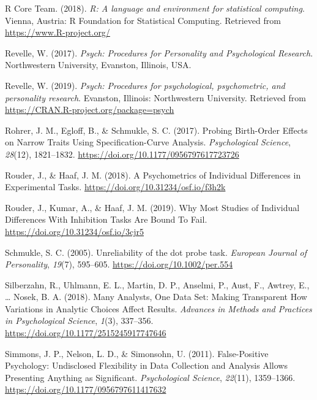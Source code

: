 \documentclass[
  english,
  man,floatsintext]{apa6}
\begin{document}
\leavevmode\hypertarget{ref-R-base}{}%
R Core Team. (2018). \emph{R: A language and environment for statistical computing}. Vienna, Austria: R Foundation for Statistical Computing. Retrieved from \url{https://www.R-project.org/}

\leavevmode\hypertarget{ref-revelle_psych:_2017-1}{}%
Revelle, W. (2017). \emph{Psych: Procedures for Personality and Psychological Research}. Northwestern University, Evanston, Illinois, USA.

\leavevmode\hypertarget{ref-R-psych}{}%
Revelle, W. (2019). \emph{Psych: Procedures for psychological, psychometric, and personality research}. Evanston, Illinois: Northwestern University. Retrieved from \url{https://CRAN.R-project.org/package=psych}

\leavevmode\hypertarget{ref-rohrer_probing_2017}{}%
Rohrer, J. M., Egloff, B., \& Schmukle, S. C. (2017). Probing Birth-Order Effects on Narrow Traits Using Specification-Curve Analysis. \emph{Psychological Science}, \emph{28}(12), 1821--1832. \url{https://doi.org/10.1177/0956797617723726}

\leavevmode\hypertarget{ref-rouder_psychometrics_2018}{}%
Rouder, J., \& Haaf, J. M. (2018). A Psychometrics of Individual Differences in Experimental Tasks. \url{https://doi.org/10.31234/osf.io/f3h2k}

\leavevmode\hypertarget{ref-rouder_why_2019}{}%
Rouder, J., Kumar, A., \& Haaf, J. M. (2019). Why Most Studies of Individual Differences With Inhibition Tasks Are Bound To Fail. \url{https://doi.org/10.31234/osf.io/3cjr5}

\leavevmode\hypertarget{ref-schmukle_unreliability_2005}{}%
Schmukle, S. C. (2005). Unreliability of the dot probe task. \emph{European Journal of Personality}, \emph{19}(7), 595--605. \url{https://doi.org/10.1002/per.554}

\leavevmode\hypertarget{ref-silberzahn_many_2018}{}%
Silberzahn, R., Uhlmann, E. L., Martin, D. P., Anselmi, P., Aust, F., Awtrey, E., \ldots{} Nosek, B. A. (2018). Many Analysts, One Data Set: Making Transparent How Variations in Analytic Choices Affect Results. \emph{Advances in Methods and Practices in Psychological Science}, \emph{1}(3), 337--356. \url{https://doi.org/10.1177/2515245917747646}

\leavevmode\hypertarget{ref-simmons_false-positive_2011}{}%
Simmons, J. P., Nelson, L. D., \& Simonsohn, U. (2011). False-Positive Psychology: Undisclosed Flexibility in Data Collection and Analysis Allows Presenting Anything as Significant. \emph{Psychological Science}, \emph{22}(11), 1359--1366. \url{https://doi.org/10.1177/0956797611417632}
\end{document}
